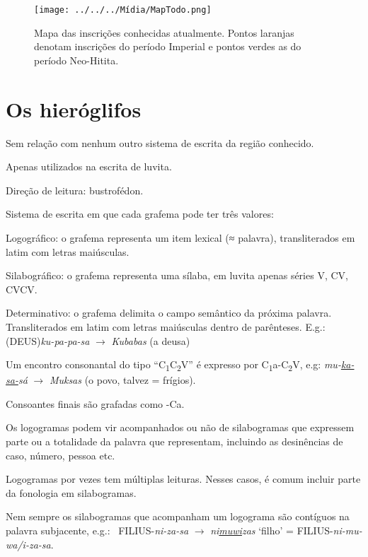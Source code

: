\documentclass[article]{luvita}
\begin{document}
\begin{figure}[htb]
	\begin{center}
		\texttt{[image: ../../../Mídia/MapTodo.png]}
	\end{center}
	\caption{Mapa das inscrições conhecidas atualmente. Pontos laranjas
		denotam inscrições do período Imperial e pontos verdes as do período
		Neo-Hitita.
	}\label{fig:todo}
\end{figure}

\chapter{Os hieróglifos}

\begin{compactitem}
	\item Sem relação com nenhum outro sistema de escrita da região conhecido.
	\item Apenas utilizados na escrita de luvita.
	\item Direção de leitura: bustrofédon.
	\item Sistema de escrita em que cada grafema pode ter três valores:
	\begin{compactitem}
		\item Logográfico: o grafema representa um item lexical (≈ palavra),
		transliterados em latim com letras maiúsculas.
		\item Silabográfico: o grafema representa uma sílaba, em luvita apenas séries V,
		CV, CVCV\@.
		\item Determinativo: o grafema delimita o campo semântico da próxima
		palavra. Transliterados em latim com letras maiúsculas dentro de parênteses.
		E.g.:\  (DEUS)\emph{ku-pa-pa-sa} $\rightarrow$ \emph{Kubabas} (a deusa)
	\end{compactitem}
	\item Um encontro consonantal do tipo ``C\textsubscript{1}C\textsubscript{2}V''
	é expresso por C\textsubscript{1}a-C\textsubscript{2}V, e.g:
	 \emph{mu-\uline{ka-sa-}sá} $\rightarrow$
	\emph{Muksas} (o povo, talvez = frígios).
	\item Consoantes finais são grafadas como -Ca.
	\item Os logogramas podem vir acompanhados ou não de silabogramas que expressem
	parte ou a totalidade da palavra que representam, incluindo as desinências de
	caso, número, pessoa etc.
	\item Logogramas por vezes tem múltiplas leituras. Nesses casos, é comum incluir
	parte da fonologia em silabogramas.
	\item Nem sempre os silabogramas que acompanham um logograma são contíguos na
	palavra subjacente, e.g.:\ 
	FILIUS-\emph{ni-za-sa} $\rightarrow$ \emph{ni\uline{muwi}zas} `filho' =
	 FILIUS-\emph{ni-mu-wa/i-za-sa}.
\end{compactitem}
\end{document}
